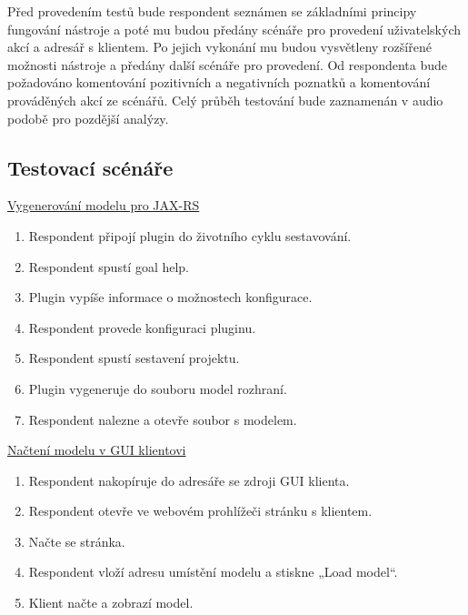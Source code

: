 \documentclass[11pt,twoside,a4paper]{book}
\begin{document}
Před provedením testů bude respondent seznámen se základními principy fungování
nástroje a poté mu budou předány scénáře pro provedení uživatelských akcí a
adresář s klientem. Po jejich vykonání mu budou vysvětleny rozšířené možnosti
nástroje a předány další scénáře pro provedení. Od respondenta bude požadováno
komentování pozitivních a negativních poznatků a komentování prováděných akcí ze
scénářů. Celý průběh testování bude zaznamenán v audio podobě pro pozdější
analýzy.

\subsection{Testovací scénáře}

\underline{Vygenerování modelu pro JAX-RS}

\begin{enumerate}
  \item Respondent připojí plugin do životního cyklu sestavování.
  
  \item Respondent spustí goal help.
  
  \item Plugin vypíše informace o možnostech konfigurace.
  
  \item Respondent provede konfiguraci pluginu.
  
  \item Respondent spustí sestavení projektu.
  
  \item Plugin vygeneruje do souboru model rozhraní.
  
  \item Respondent nalezne a otevře soubor s modelem.
\end{enumerate}

\underline{Načtení modelu v GUI klientovi}

\begin{enumerate}
  \item Respondent nakopíruje do adresáře se zdroji GUI klienta.
  
  \item Respondent otevře ve webovém prohlížeči stránku s klientem.
  
  \item Načte se stránka.
  
  \item Respondent vloží adresu umístění modelu a stiskne „Load model“.
  
  \item Klient načte a zobrazí model.
\end{enumerate}
  
\end{document}
